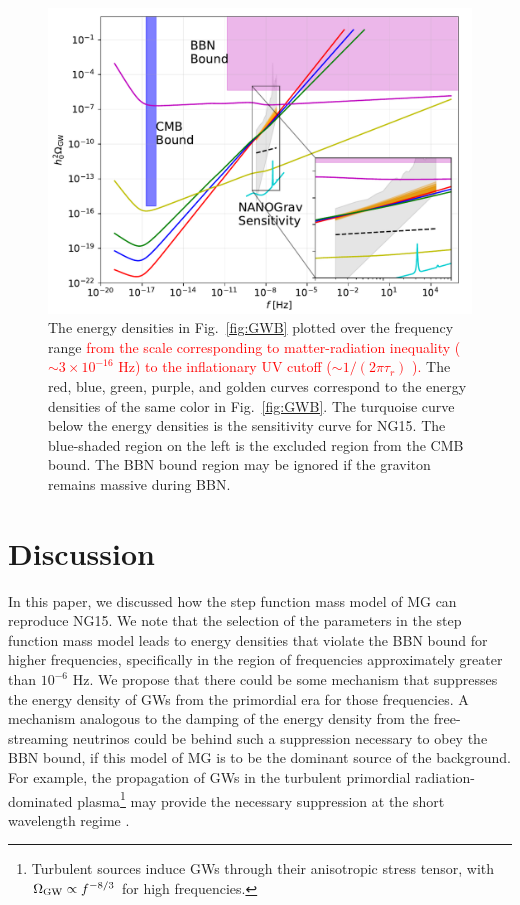 \documentclass[prd,twocolumn,aps,psfig,nofootinbib,nobibnotes,superscriptaddress,preprintnumbers,times]{revtex4-2}
\def\red{\textcolor{red}}
\begin{document}
\begin{figure}[ht]
    \includegraphics[width=\linewidth]{fig4.pdf}
    \caption{The energy densities in Fig.\ \ref{fig:GWB} plotted over the frequency range \red{from the scale corresponding to matter-radiation inequality ($\sim 3\times10^{-16}$ Hz) to the inflationary UV cutoff ($\sim 1/(2\pi\tau_r)$ \cite{Fujita:2018ehq}).} The red, blue, green, purple, and golden curves correspond to the energy densities of the same color in Fig.\ \ref{fig:GWB}. The turquoise curve below the energy densities is the sensitivity curve for NG15. The blue-shaded region on the left is the excluded region from the CMB bound. The BBN bound region may be ignored if the graviton remains massive during BBN.} 
    \label{fig:supp}
\end{figure}

\section{Discussion}\label{sec:discussion}
In this paper, we discussed how the step function mass model of MG can reproduce NG15. We note that the selection of the parameters in the step function mass model leads to energy densities that violate the BBN bound for higher frequencies, specifically in the region of frequencies approximately greater than $10^{-6}$ Hz. We propose that there could be some mechanism that suppresses the energy density of GWs from the primordial era for those frequencies. A mechanism analogous to the damping of the energy density from the free-streaming neutrinos \cite{Durrer:1997ta,Weinberg:2003ur} could be behind such a suppression necessary to obey the BBN bound, if this model of MG is to be the dominant source of the background. For example, the propagation of GWs in the turbulent primordial radiation-dominated plasma\footnote{Turbulent sources induce GWs through their anisotropic stress tensor, with $\Omega_{\rm GW} \propto f^{-8/3}$ for high frequencies.} \cite{RoperPol:2019wvy} may provide the necessary suppression at the short wavelength regime \cite{Deryagin:1986}. 
\end{document}
